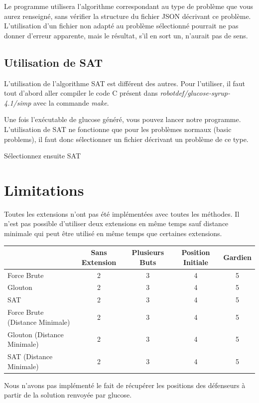 Le programme utilisera l'algorithme correspondant au type de problème que vous aurez renseigné, sans vérifier la structure du fichier JSON décrivant ce problème. L'utilisation d'un fichier non adapté au problème sélectionné pourrait ne pas donner d'erreur apparente, mais le résultat, s'il en sort un, n'aurait pas de sens.

\subsection{Utilisation de SAT}

L'utilisation de l'algorithme SAT est différent des autres. Pour l'utiliser, il faut tout d'abord aller compiler le code C présent dans \textit{robotdef/glucose-syrup-4.1/simp} avec la commande \textit{make}.

Une fois l'exécutable de glucose généré, vous pouvez lancer notre programme. L'utilisation de SAT ne fonctionne que pour les problèmes normaux (basic problems), il faut donc sélectionner un fichier décrivant un problème de ce type. 

Sélectionnez ensuite SAT


\section{Limitations}

Toutes les extensions n'ont pas été implémentées avec toutes les méthodes. Il n'est pas possible d'utiliser deux extensions en même temps sauf distance minimale qui peut être utilisé en même temps que certaines extensions.

\begin{tabular}{| l | c | c | c | c |}
 \hline		
     & Sans Extension & Plusieurs Buts & Position Initiale & Gardien \\
   \hline 
   Force Brute & 2 & 3 & 4 & 5\\
  \hline  
 Glouton & 2 & 3 & 4  & 5\\
 \hline  
 SAT & 2 & 3 & 4  & 5\\
 \hline  
 Force Brute (Distance Minimale) & 2 & 3 & 4  & 5\\
 \hline  
 Glouton (Distance Minimale) & 2 & 3 & 4  & 5\\
 \hline 
 SAT (Distance Minimale) & 2 & 3 & 4  & 5\\
  \hline  
 \end{tabular}

Nous n'avons pas implémenté le fait de récupérer les positions des défenseurs à partir de la solution renvoyée par glucose. 

